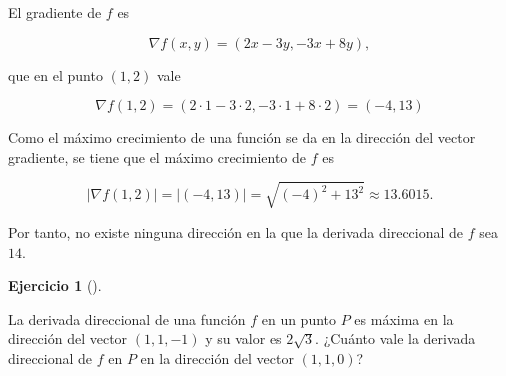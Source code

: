 \documentclass[
  spanish,
  a4paper,
]{scrreport}
\theoremstyle{definition}
\newtheorem{exercise}{Ejercicio}[chapter]
\theoremstyle{remark}
\begin{document}
\begin{tcolorbox}[enhanced jigsaw, arc=.35mm, bottomrule=.15mm, bottomtitle=1mm, breakable, colback=white, colbacktitle=quarto-callout-tip-color!10!white, colframe=quarto-callout-tip-color-frame, coltitle=black, left=2mm, leftrule=.75mm, opacityback=0, opacitybacktitle=0.6, rightrule=.15mm, title=\textcolor{quarto-callout-tip-color}{\faLightbulb}\hspace{0.5em}{Solución}, titlerule=0mm, toprule=.15mm, toptitle=1mm]

El gradiente de \(f\) es

\[
\nabla f(x,y) = (2x-3y, -3x+8y),
\]

que en el punto \((1,2)\) vale

\[
\nabla f(1,2) 
= (2\cdot 1 -3\cdot 2, -3\cdot 1 + 8\cdot 2) 
= (-4, 13)
\]

Como el máximo crecimiento de una función se da en la dirección del
vector gradiente, se tiene que el máximo crecimiento de \(f\) es

\[
|\nabla f(1,2)| 
= |(-4, 13)| 
= \sqrt{(-4)^2+13^2} 
\approx 13.6015.
\]

Por tanto, no existe ninguna dirección en la que la derivada direccional
de \(f\) sea \(14\).

\end{tcolorbox}

\begin{exercise}[]\protect\hypertarget{exr-derivada-direccional-2}{}\label{exr-derivada-direccional-2}

La derivada direccional de una función \(f\) en un punto \(P\) es máxima
en la dirección del vector \((1,1,-1)\) y su valor es \(2\sqrt{3}\).
¿Cuánto vale la derivada direccional de \(f\) en \(P\) en la dirección
del vector \((1,1,0)\)?

\end{exercise}
\end{document}
